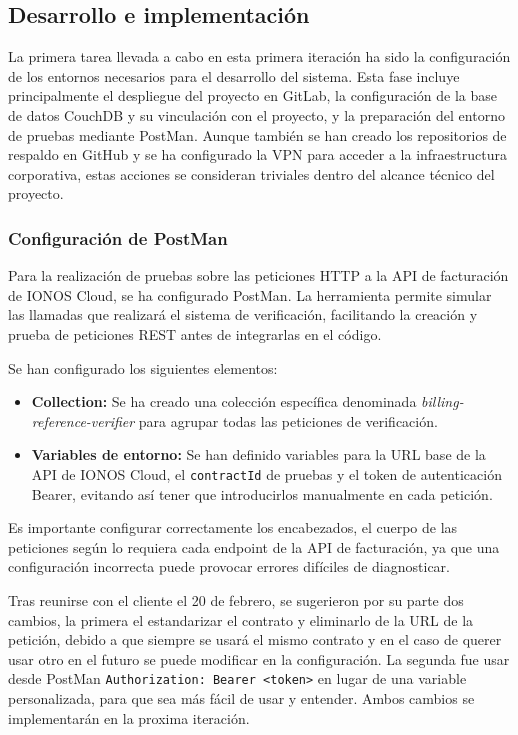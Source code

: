\subsection{Desarrollo e implementación}

La primera tarea llevada a cabo en esta primera iteración ha sido la configuración de los entornos necesarios para el desarrollo del sistema. Esta fase incluye principalmente el despliegue del proyecto en GitLab, la configuración de la base de datos CouchDB y su vinculación con el proyecto, y la preparación del entorno de pruebas mediante PostMan. Aunque también se han creado los repositorios de respaldo en GitHub y se ha configurado la VPN para acceder a la infraestructura corporativa, estas acciones se consideran triviales dentro del alcance técnico del proyecto.

\subsubsection{Configuración de PostMan}
Para la realización de pruebas sobre las peticiones HTTP a la API de facturación de IONOS Cloud, se ha configurado PostMan. La herramienta permite simular las llamadas que realizará el sistema de verificación, facilitando la creación y prueba de peticiones REST antes de integrarlas en el código.

Se han configurado los siguientes elementos:
\begin{itemize}
    \item \textbf{Collection:} Se ha creado una colección específica denominada \textit{billing-reference-verifier} para agrupar todas las peticiones de verificación.
    \item \textbf{Variables de entorno:} Se han definido variables para la URL base de la API de IONOS Cloud, el \texttt{contractId} de pruebas y el token de autenticación Bearer, evitando así tener que introducirlos manualmente en cada petición.
\end{itemize}

Es importante configurar correctamente los encabezados, el cuerpo de las peticiones según lo requiera cada endpoint de la API de facturación, ya que una configuración incorrecta puede provocar errores difíciles de diagnosticar.

Tras reunirse con el cliente el 20 de febrero, se sugerieron por su parte dos cambios, la primera el estandarizar el contrato y eliminarlo de la URL de la petición, debido a que siempre se usará el mismo contrato y en el caso de querer usar otro en el futuro se puede modificar en la configuración. La segunda fue usar desde PostMan \texttt{Authorization: Bearer <token>} en lugar de una variable personalizada, para que sea más fácil de usar y entender. Ambos cambios se implementarán en la proxima iteración.

